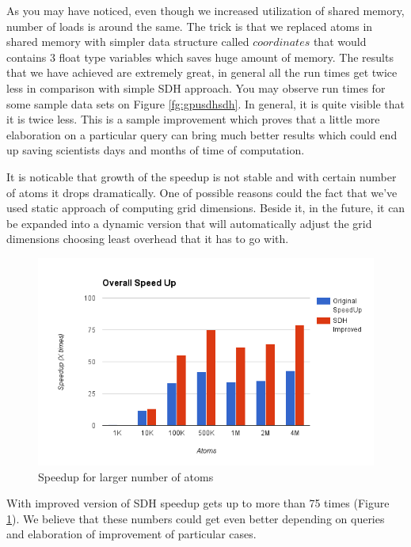 \documentclass[12pt,letterpaper]{report}
\begin{document}
\noindent\hspace{3em}As you may have noticed, even though we increased utilization of shared memory, number of loads is around the same. The trick is that we replaced atoms in shared memory with simpler data structure called $coordinates$ that would contains 3 float type variables which saves huge amount of memory. The results that we have achieved are extremely great, in general all the run times get twice less in comparison with simple SDH approach. You may observe run times for some sample data sets on Figure \ref{fg:gpusdhsdh}. In general, it is quite visible that it is twice less. 
This is a sample improvement which proves that a little more elaboration on a particular query can bring much better results which could end up saving scientists days and months of time of computation.

\noindent\hspace{3em} It is noticable that growth of the speedup is not stable and with certain number of atoms it drops dramatically. One of possible reasons could the fact that we've used static approach of computing grid dimensions. Beside it, in the future, it can be expanded into a dynamic version that will automatically adjust the grid dimensions choosing least overhead that it has to go with.

\begin{figure}
 \centerline{\includegraphics[width=0.8\columnwidth]{images/overall_speedup}}
 \caption{Speedup for larger number of atoms}
 \label{fg:chart_max}
\end{figure}

\noindent\hspace{3em}With improved version of SDH speedup gets up to more than 75 times (Figure \ref{fg:chart_max}). We believe that these numbers could get even better depending on queries and elaboration of improvement of particular cases.
\end{document}
